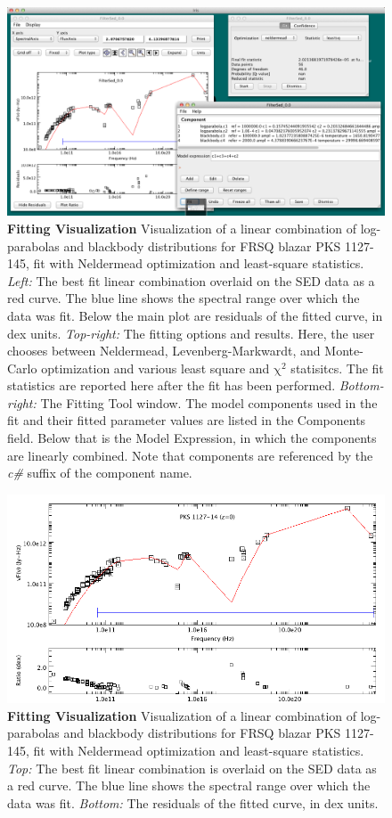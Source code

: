 \documentclass[preprint,12pt,3p]{elsarticle}
\begin{document}
\begin{figure}[h!]
\begin{center}
\includegraphics[width=0.7\columnwidth]{figures/fitting-1/fitting-1.png}
\caption{\textbf{\label{fig:fitting1} Fitting Visualization} Visualization of a linear combination of log-parabolas and blackbody distributions for FRSQ blazar PKS 1127-145, fit with Neldermead optimization and least-square statistics. \textit{Left:} The best fit linear combination overlaid on the SED data as a red curve. The blue line shows the spectral range over which the data was fit. Below the main plot are residuals of the fitted curve, in dex units. \textit{Top-right:} The fitting options and results. Here, the user chooses between Neldermead, Levenberg-Markwardt, and Monte-Carlo optimization and various least square and $\mathrm{\chi}^{2}$ statisitcs. The fit statistics are reported here after the fit has been performed. \textit{Bottom-right:} The Fitting Tool window. The model components used in the fit and their fitted parameter values are listed in the Components field. Below that is the Model Expression, in which the components are linearly combined. Note that components are referenced by the \textit{c\#} suffix of the component name.}
\end{center}
\end{figure}

\begin{figure}[h!]
\begin{center}
\includegraphics[width=0.7\columnwidth]{figures/all-models-plot-only2/all-models-plot-only2.png}
\caption{\textbf{\label{fig:fitting} Fitting Visualization} Visualization of a linear combination of log-parabolas and blackbody distributions for FRSQ blazar PKS 1127-145, fit with Neldermead optimization and least-square statistics. \textit{Top:} The best fit linear combination is overlaid on the SED data as a red curve. The blue line shows the spectral range over which the data was fit. \textit{Bottom:} The residuals of the fitted curve, in dex units.}
\end{center}
\end{figure}
\end{document}
